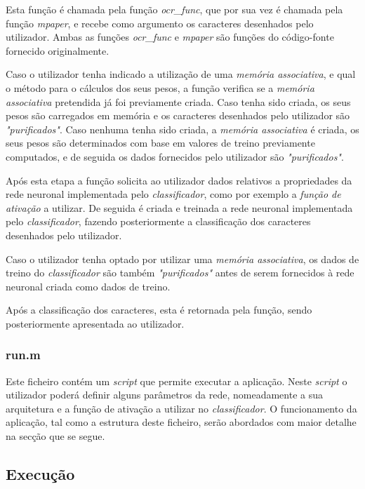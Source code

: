 \documentclass{article}
\begin{document}
Esta função é chamada pela função \emph{ocr\_func}, que por sua vez é chamada pela função \emph{mpaper}, e recebe como argumento os caracteres desenhados pelo utilizador. Ambas as funções \emph{ocr\_func} e \emph{mpaper} são funções do código-fonte fornecido originalmente.

Caso o utilizador tenha indicado a utilização de uma \emph{memória associativa}, e qual o método para o cálculos dos seus pesos, a função verifica se a \emph{memória associativa} pretendida já foi previamente criada. Caso tenha sido criada, os seus pesos são carregados em memória e os caracteres desenhados pelo utilizador são \emph{"purificados"}. Caso nenhuma tenha sido criada, a \emph{memória associativa} é criada, os seus pesos são determinados com base em valores de treino previamente computados, e de seguida os dados fornecidos pelo utilizador são \emph{"purificados"}.

Após esta etapa a função solicita ao utilizador dados relativos a propriedades da rede neuronal implementada pelo \emph{classificador}, como por exemplo a \emph{função de ativação} a utilizar. De seguida é criada e treinada a rede neuronal implementada pelo \emph{classificador}, fazendo posteriormente a classificação dos caracteres desenhados pelo utilizador.

Caso o utilizador tenha optado por utilizar uma \emph{memória associativa}, os dados de treino do \emph{classificador} são também \emph{"purificados"} antes de serem fornecidos à rede neuronal criada como dados de treino.

Após a classificação dos caracteres, esta é retornada pela função, sendo posteriormente apresentada ao utilizador.

\subsubsection{run.m}

Este ficheiro contém um \emph{script} que permite executar a aplicação. Neste \emph{script} o utilizador poderá definir alguns parâmetros da rede, nomeadamente a sua arquitetura e a função de ativação a utilizar no \emph{classificador}. O funcionamento da aplicação, tal como a estrutura deste ficheiro, serão abordados com maior detalhe na secção que se segue.

\subsection{Execução}
\end{document}
